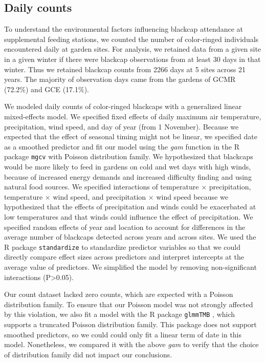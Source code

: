 \documentclass[a4paper, nobind]{templates/ociamthesis}
\begin{document}
\hypertarget{daily-counts}{%
\subsection{Daily counts}\label{daily-counts}}

To understand the environmental factors influencing blackcap attendance at supplemental feeding stations, we counted the number of color-ringed individuals encountered daily at garden sites. For analysis, we retained data from a given site in a given winter if there were blackcap observations from at least 30 days in that winter. Thus we retained blackcap counts from 2266 days at 5 sites across 21 years. The majority of observation days came from the gardens of GCMR (72.2\%) and GCE (17.1\%).

We modeled daily counts of color-ringed blackcaps with a generalized linear mixed-effects model. We specified fixed effects of daily maximum air temperature, precipitation, wind speed, and day of year (from 1 November). Because we expected that the effect of seasonal timing might not be linear, we specified date as a smoothed predictor and fit our model using the \emph{gam} function in the R package \texttt{mgcv} \autocite{woodGeneralizedAdditiveModels2017} with Poisson distribution family. We hypothesized that blackcaps would be more likely to feed in gardens on cold and wet days with high winds, because of increased energy demands and increased difficulty finding and using natural food sources. We specified interactions of temperature \(\times\) precipitation, temperature \(\times\) wind speed, and precipitation \(\times\) wind speed because we hypothesized that the effects of precipitation and winds could be exacerbated at low temperatures and that winds could influence the effect of precipitation. We specified random effects of year and location to account for differences in the average number of blackcaps detected across years and across sites. We used the R package \texttt{standardize} to standardize predictor variables so that we could directly compare effect sizes across predictors and interpret intercepts at the average value of predictors. We simplified the model by removing non-significant interactions (P\textgreater0.05).

Our count dataset lacked zero counts, which are expected with a Poisson distribution family. To ensure that our Poisson model was not strongly affected by this violation, we also fit a model with the R package \texttt{glmmTMB} \autocite{brooksGlmmTMBBalancesSpeed2017}, which supports a truncated Poisson distribution family. This package does not support smoothed predictors, so we could could only fit a linear term of date in this model. Nonetheless, we compared it with the above \emph{gam} to verify that the choice of distribution family did not impact our conclusions.
\end{document}

